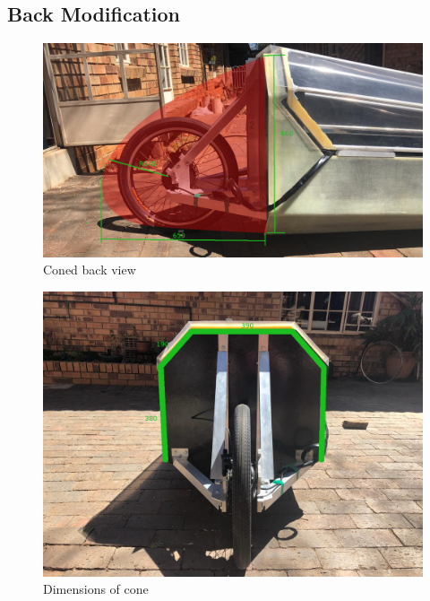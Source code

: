 \documentclass[a4paper, 12pt]{article}
\begin{document}
\begin{appendices}
		\section{Back Modification}
		\label{sec:back_modification}

		\begin{figure}[H]
			\centering
			\includegraphics[width = 150mm]{img/Back_Side_View_Coned.png}
			\caption{Coned back view}
			\label{fig:coned_back_view}
		\end{figure}

		\begin{figure}[H]
			\centering
			\includegraphics[width = 150mm]{img/Back_View_Dimensions.jpeg}
			\caption{Dimensions of cone}
			\label{fig:back_view_dimensions}
		\end{figure}

	\end{appendices}
\end{document}
